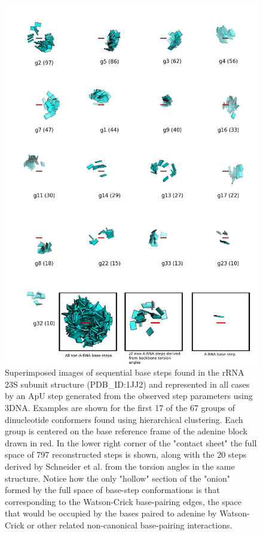 \begin{figure}
\centering
\includegraphics[angle=0, scale=0.28]{Chapter2/k67_17.png}
\caption{Superimposed  images of  sequential base  steps found  in the
  rRNA  23S subunit  structure (PDB\_ID:1JJ2)  and represented  in all
  cases by  an ApU  step generated from  the observed  step parameters
  using 3DNA. Examples are shown for  the first 17 of the 67 groups of
  dinucleotide conformers  found using hierarchical  clustering.  Each
  group is centered  on the base reference frame  of the adenine block
  drawn in red.  In the lower  right corner of the "contact sheet" the
  full space  of 797 reconstructed steps  is shown, along  with the 20
  steps  derived by  Schneider et  al.  \cite{schneider2004}  from the
  torsion angles in the same  structure.  Notice how the only "hollow"
  section  of  the "onion"  formed  by  the  full space  of  base-step
  conformations is that corresponding to the Watson-Crick base-pairing
  edges,  the space  that would  be occupied  by the  bases  paired to
  adenine by Watson-Crick  or other related non-canonical base-pairing
  interactions.}
\label{fig:noarnak67}
\end{figure}

